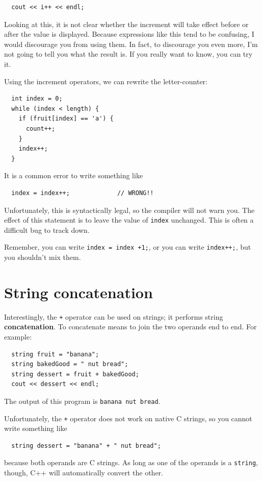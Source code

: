 \begin{verbatim}
  cout << i++ << endl;
\end{verbatim}
%
Looking at this, it is not clear whether the increment will
take effect before or after the value is displayed.  Because
expressions like this tend to be confusing, I would discourage
you from using them.  In fact, to discourage you even more,
I'm not going to tell you what the result is.  If you really
want to know, you can try it.

Using the increment operators, we can rewrite the letter-counter:

\begin{verbatim}
  int index = 0;
  while (index < length) {
    if (fruit[index] == 'a') {
      count++;
    }
    index++;
  }
\end{verbatim}
%
It is a common error to write something like

\begin{verbatim}
  index = index++;             // WRONG!!
\end{verbatim}
%
Unfortunately, this is syntactically legal, so the compiler
will not warn you.  The effect of this statement is to leave
the value of {\tt index} unchanged.  This is often a difficult
bug to track down.

Remember, you can write {\tt index = index +1;}, or you
can write {\tt index++;}, but you shouldn't mix them.

\section{String concatenation}

Interestingly, the {\tt +} operator can be used on strings;
it performs string {\bf concatenation}.  To concatenate means to
join the two operands end to end.  For example:

\begin{verbatim}
  string fruit = "banana";
  string bakedGood = " nut bread";
  string dessert = fruit + bakedGood;
  cout << dessert << endl;
\end{verbatim}
%
The output of this program is {\tt banana nut bread}.

Unfortunately, the {\tt +} operator does not work on native
C strings, so you cannot write something like

\begin{verbatim}
  string dessert = "banana" + " nut bread";
\end{verbatim}
%
because both operands are C strings.  As long as one of the
operands is a {\tt string}, though, C++ will automatically
convert the other.

